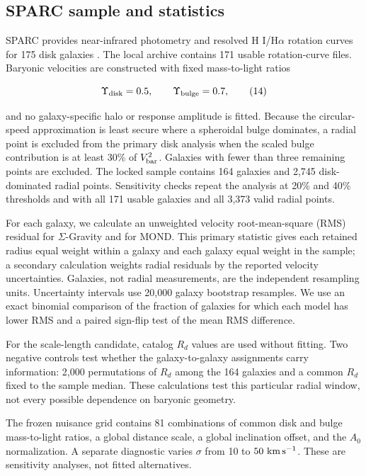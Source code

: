 \documentclass[utf8]{FrontiersinHarvard}
\begin{document}
\subsection{SPARC sample and statistics}\label{sparc-sample-and-statistics}

SPARC provides near-infrared photometry and resolved H I/H\(\alpha\) rotation curves for 175 disk galaxies \citep{lelli2016}. The local archive contains 171 usable rotation-curve files. Baryonic velocities are constructed with fixed mass-to-light ratios

\[
\Upsilon_{\rm disk}=0.5,\qquad
\Upsilon_{\rm bulge}=0.7,
\tag{14}
\]

and no galaxy-specific halo or response amplitude is fitted. Because the circular-speed approximation is least secure where a spheroidal bulge dominates, a radial point is excluded from the primary disk analysis when the scaled bulge contribution is at least 30\% of \(V_{\rm bar}^2\). Galaxies with fewer than three remaining points are excluded. The locked sample contains 164 galaxies and 2,745 disk-dominated radial points. Sensitivity checks repeat the analysis at 20\% and 40\% thresholds and with all 171 usable galaxies and all 3,373 valid radial points.

For each galaxy, we calculate an unweighted velocity root-mean-square (RMS) residual for \(\Sigma\)-Gravity and for MOND. This primary statistic gives each retained radius equal weight within a galaxy and each galaxy equal weight in the sample; a secondary calculation weights radial residuals by the reported velocity uncertainties. Galaxies, not radial measurements, are the independent resampling units. Uncertainty intervals use 20,000 galaxy bootstrap resamples. We use an exact binomial comparison of the fraction of galaxies for which each model has lower RMS and a paired sign-flip test of the mean RMS difference.

For the scale-length candidate, catalog \(R_d\) values are used without fitting. Two negative controls test whether the galaxy-to-galaxy assignments carry information: 2,000 permutations of \(R_d\) among the 164 galaxies and a common \(R_d\) fixed to the sample median. These calculations test this particular radial window, not every possible dependence on baryonic geometry.

The frozen nuisance grid contains 81 combinations of common disk and bulge mass-to-light ratios, a global distance scale, a global inclination offset, and the \(A_0\) normalization. A separate diagnostic varies \(\sigma\) from 10 to \(50\ {\rm km\,s^{-1}}\). These are sensitivity analyses, not fitted alternatives.
\end{document}
